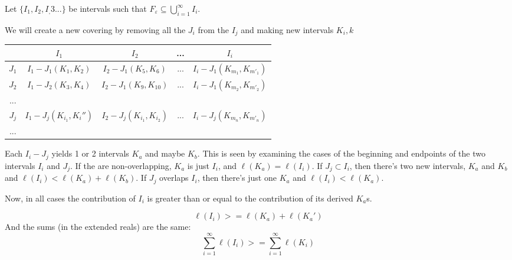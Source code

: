 \documentclass[11pt,oneside]{article}
\numberwithin{equation}{section}
\theoremstyle{definition}
\newtheorem{exercise}{Exercise}
\begin{document}
\begin{solution}
\begin{enumerate}[(a)]
      Let $ \{ I_1, I_2, I_,3 ... \}$ be intervals such that
      $ F _ \varepsilon  \subseteq \bigcup \limits _ {i=1} ^ \infty I_i$.

      We will create a new covering by removing all the $J_i$ from the
      $I_j$ and making new intervals $K_i,k$

      \begin{tabular}{ |c|c|c|c|c|}
        \hline
        \   & $I_1$   & $I_2$ & ... & $I_i$ \\
        \hline
        $J_1$ & $I_1 - J_1 (K_1, K_2)$ & $I_2 - J_1 (K_5, K_6)$ & ... & $I_i - J_1 (K_{m_1}, K_{m'_1})$ \\
        $J_2$ & $I_1 - J_2 (K_3, K_4)$ & $I_2 - J_1 (K_9, K_{10})$ & ... & $I_i - J_1 (K_{m_2}, K_{m'_2})$ \\
        ... &       &   &  &  \\
        $J_j$ & $I_1 - J_j (K_{i_1}, K_i'')$ & $I_2 - J_j (K_{i_1}, K_{i_2})$ & ... & $ I_i - J_j (K_{m_n}, K_{m'_n})$ \\
        ... &       &   &  &  \\
        \hline
      \end{tabular}
      Each $I_i - J_j$ yields 1 or 2 intervals $K_a$ and maybe $K_b$.
      This is seen by examining the cases of the beginning and
      endpoints of the two intervals $I_i$ and $J_j$.  If the are
      non-overlapping, $K_a$ is just $I_i$, and $ \ell(K_a) =
      \ell(I_i)$.  If $J_j \subset I_i$, then there's two new
      intervals, $K_a$ and $K_b$ and $\ell (I_i) < \ell (K_a) + \ell
      (K_b)$.  If $J_j$ overlaps $I_i$, then there's just one $K_a$ and
      $ \ell (I_i) < \ell (K_a)$.

      Now, in all cases the contribution of $I_i$ is greater than or
      equal to the contribution of its derived $K_a$s.  

      $$ \ell(I_i) >= \ell(K_a) + \ell(K_a')
      $$
      And the sums (in the extended reals) are the same:
      $$
      \sum \limits _ {i=1} ^ \infty \ell(I_i) >= \sum \limits _ { i = 1} ^ \infty \ell(K_i )
      $$
      
  \end{enumerate}
\end{solution}


\begin{comment}
\begin{exercise}
  problem
\end{exercise}
\begin{solution}
\begin{enumerate}[(a)]
\item
  first answer
\end{enumerate}
\end{solution}
\end{comment}
\end{document}
